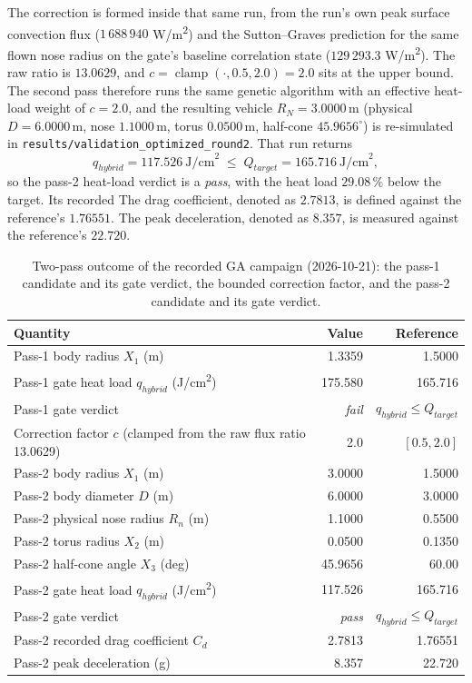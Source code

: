 The correction is formed inside that same run, from the run's own peak surface convection flux ($1\,688\,940$ W/m\textsuperscript{2}) and the Sutton--Graves prediction for the same flown nose radius on the gate's baseline correlation state ($129\,293.3$ W/m\textsuperscript{2}). The raw ratio is $13.0629$, and $c = \operatorname{clamp}(\cdot, 0.5, 2.0) = 2.0$ sits at the upper bound. The second pass therefore runs the same genetic algorithm with an effective heat-load weight of $c = 2.0$, and the resulting vehicle $R_N = 3.0000$\,m (physical $D = 6.0000$\,m, nose $1.1000$\,m, torus $0.0500$\,m, half-cone $45.9656^\circ$) is re-simulated in
\texttt{results/validation\_optimized\_round2}. That run returns
\begin{equation}
    q_{hybrid} = 117.526\ \text{J/cm}^2 \;\leq\; Q_{target} = 165.716\ \text{J/cm}^2,
    \label{eq:gate_pass}
\end{equation}
so the pass-2 heat-load verdict is a \emph{pass}, with the heat load $29.08\,\%$ below the target. Its recorded
The drag coefficient, denoted as $2.7813$, is defined against the reference's $1.76551$. The peak deceleration, denoted as $8.357$, is measured against the reference's $22.720$.

\begin{table}[htbp]
    \centering
    \caption{Two-pass outcome of the recorded GA campaign (2026-10-21): the pass-1 candidate and its
    gate verdict, the bounded correction factor, and the pass-2 candidate and its gate verdict.}
    \label{tab:ga_two_pass}
    \begin{tabularx}{\textwidth}{Xrr}
        \toprule
        \textbf{Quantity} & \textbf{Value} & \textbf{Reference} \\
        \midrule
        Pass-1 body radius $X_1$ (m) & 1.3359 & 1.5000 \\
        Pass-1 gate heat load $q_{hybrid}$ (J/cm\textsuperscript{2}) & 175.580 & 165.716 \\
        Pass-1 gate verdict & \emph{fail} & $q_{hybrid} \leq Q_{target}$ \\
        Correction factor $c$ (clamped from the raw flux ratio 13.0629) & 2.0 & $[0.5, 2.0]$ \\
        Pass-2 body radius $X_1$ (m) & 3.0000 & 1.5000 \\
        Pass-2 body diameter $D$ (m) & 6.0000 & 3.0000 \\
        Pass-2 physical nose radius $R_n$ (m) & 1.1000 & 0.5500 \\
        Pass-2 torus radius $X_2$ (m) & 0.0500 & 0.1350 \\
        Pass-2 half-cone angle $X_3$ (deg) & 45.9656 & 60.00 \\
        Pass-2 gate heat load $q_{hybrid}$ (J/cm\textsuperscript{2}) & 117.526 & 165.716 \\
        Pass-2 gate verdict & \emph{pass} & $q_{hybrid} \leq Q_{target}$ \\
        Pass-2 recorded drag coefficient $C_d$ & 2.7813 & 1.76551 \\
        Pass-2 peak deceleration (g) & 8.357 & 22.720 \\
        \bottomrule
    \end{tabularx}
\end{table}

